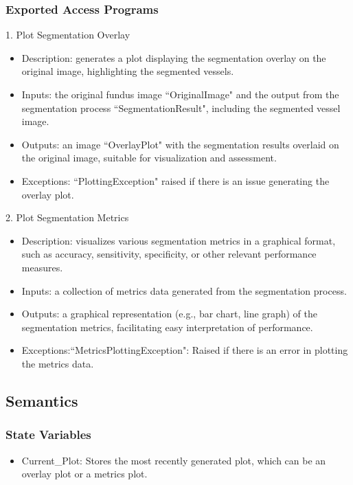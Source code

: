 \documentclass[12pt, titlepage]{article}
\begin{document}
\subsubsection{Exported Access Programs}
1. Plot Segmentation Overlay
\begin{itemize}
    \item Description: generates a plot displaying the segmentation overlay on the original image, highlighting the segmented vessels.
    \item Inputs: the original fundus image ``OriginalImage" and the output from the segmentation process ``SegmentationResult", including the segmented vessel image.
    \item Outputs: an image ``OverlayPlot" with the segmentation results overlaid on the original image, suitable for visualization and assessment.
    \item Exceptions: ``PlottingException" raised if there is an issue generating the overlay plot.
\end{itemize}

2. Plot Segmentation Metrics
\begin{itemize}
    \item Description: visualizes various segmentation metrics in a graphical format, such as accuracy, sensitivity, specificity, or other relevant performance measures.
    \item Inputs: a collection of metrics data generated from the segmentation process.
    \item Outputs: a graphical representation (e.g., bar chart, line graph) of the segmentation metrics, facilitating easy interpretation of performance.
    \item Exceptions:``MetricsPlottingException": Raised if there is an error in plotting the metrics data.
\end{itemize}


\subsection{Semantics}

\subsubsection{State Variables}
\begin{itemize}
    \item Current\_Plot: Stores the most recently generated plot, which can be an overlay plot or a metrics plot.
\end{itemize}
\end{document}

